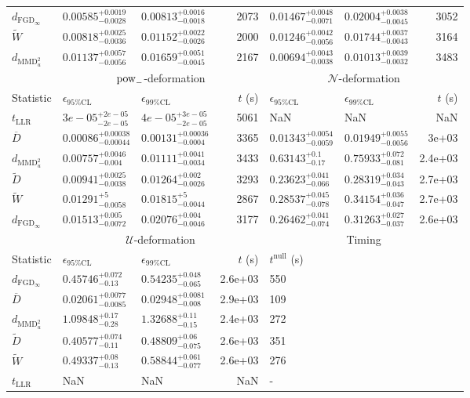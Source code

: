 \begin{tabular}{l|llr|llr}
	$d_{\mathrm{FGD}_{\infty}}$ & $0.00585_{-0.0028}^{+0.0019}$ & $0.00813_{-0.0018}^{+0.0016}$ & 2073 & $0.01467_{-0.0071}^{+0.0048}$ & $0.02004_{-0.0045}^{+0.0038}$ & 3052 \\
	$\widetilde{W}$ & $0.00818_{-0.0036}^{+0.0025}$ & $0.01152_{-0.0026}^{+0.0022}$ & 2000 & $0.01246_{-0.0056}^{+0.0042}$ & $0.01744_{-0.0043}^{+0.0037}$ & 3164 \\
	$d_{\mathrm{MMD}^{2}_{u}}$ & $0.01137_{-0.0056}^{+0.0057}$ & $0.01659_{-0.0045}^{+0.0051}$ & 2167 & $0.00694_{-0.0038}^{+0.0043}$ & $0.01013_{-0.0032}^{+0.0039}$ & 3483 \\
	\toprule
	\multicolumn{1}{c}{} & \multicolumn{3}{c}{$\rm{pow}_{-}$-deformation} & \multicolumn{3}{c}{$\mathcal{N}$-deformation} \\
	Statistic & $\epsilon_{95\%\mathrm{CL}}$ & $\epsilon_{99\%\mathrm{CL}}$ & $t$ (s) & $\epsilon_{95\%\mathrm{CL}}$ & $\epsilon_{99\%\mathrm{CL}}$ & $t$ (s) \\
	\midrule
	$t_{\mathrm{LLR}}$ & $3e-05_{-2e-05}^{+2e-05}$ & $4e-05_{-2e-05}^{+3e-05}$ & 5061 & NaN & NaN & NaN \\
	$\overline{D}$ & $0.00086_{-0.00044}^{+0.00038}$ & $0.00131_{-0.0004}^{+0.00036}$ & 3365 & $0.01343_{-0.0059}^{+0.0054}$ & $0.01949_{-0.0056}^{+0.0055}$ & 3e+03 \\
	$d_{\mathrm{MMD}^{2}_{u}}$ & $0.00757_{-0.004}^{+0.0046}$ & $0.01111_{-0.0034}^{+0.0041}$ & 3433 & $0.63143_{-0.17}^{+0.1}$ & $0.75933_{-0.081}^{+0.072}$ & 2.4e+03 \\
	$\widetilde{D}$ & $0.00941_{-0.0038}^{+0.0025}$ & $0.01264_{-0.0026}^{+0.002}$ & 3293 & $0.23623_{-0.066}^{+0.041}$ & $0.28319_{-0.043}^{+0.034}$ & 2.7e+03 \\
	$\widetilde{W}$ & $0.01291_{-0.0058}^{+5}$ & $0.01815_{-0.0044}^{+5}$ & 2867 & $0.28537_{-0.078}^{+0.045}$ & $0.34154_{-0.047}^{+0.036}$ & 2.7e+03 \\
	$d_{\mathrm{FGD}_{\infty}}$ & $0.01513_{-0.0072}^{+0.005}$ & $0.02076_{-0.0046}^{+0.004}$ & 3177 & $0.26462_{-0.074}^{+0.041}$ & $0.31263_{-0.037}^{+0.027}$ & 2.6e+03 \\
	\toprule
	\multicolumn{1}{c}{} & \multicolumn{3}{c}{$\mathcal{U}$-deformation} & \multicolumn{3}{c}{Timing} \\
	Statistic & $\epsilon_{95\%\mathrm{CL}}$ & $\epsilon_{99\%\mathrm{CL}}$ & $t$ (s) & $t^{\mathrm{null}}$ (s) \\
	\midrule
	$d_{\mathrm{FGD}_{\infty}}$ & $0.45746_{-0.13}^{+0.072}$ & $0.54235_{-0.065}^{+0.048}$ & 2.6e+03 & 550 \\
	$\overline{D}$ & $0.02061_{-0.0085}^{+0.0077}$ & $0.02948_{-0.008}^{+0.0081}$ & 2.9e+03 & 109 \\
	$d_{\mathrm{MMD}^{2}_{u}}$ & $1.09848_{-0.28}^{+0.17}$ & $1.32688_{-0.15}^{+0.11}$ & 2.4e+03 & 272 \\
	$\widetilde{D}$ & $0.40577_{-0.11}^{+0.074}$ & $0.48809_{-0.075}^{+0.06}$ & 2.6e+03 & 351 \\
	$\widetilde{W}$ & $0.49337_{-0.13}^{+0.08}$ & $0.58844_{-0.077}^{+0.061}$ & 2.6e+03 & 276 \\
	$t_{\mathrm{LLR}}$ & NaN & NaN & NaN & - \\
	\bottomrule
\end{tabular}